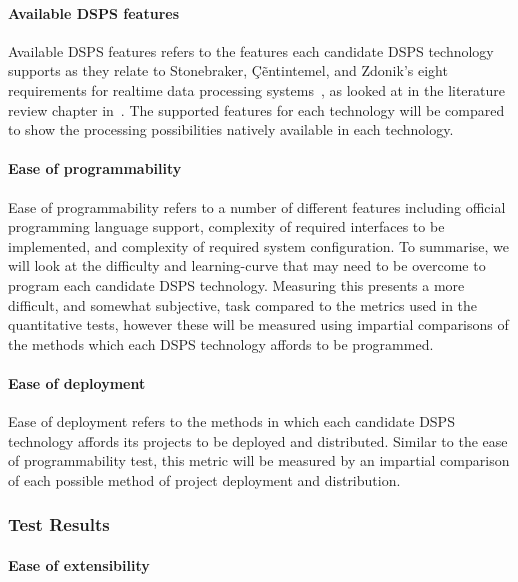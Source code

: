 \paragraph{Available DSPS features}

Available DSPS features refers to the features each candidate DSPS technology supports as they relate to Stonebraker,
\c{C}\~entintemel, and Zdonik's eight requirements for realtime data processing systems~\cite{stonebraker_8_2005}, as looked at
in the literature review chapter in~. The supported features for each technology will be compared to show the
processing possibilities natively available in each technology.

\paragraph{Ease of programmability}

Ease of programmability refers to a number of different features including official programming language support, complexity
of required interfaces to be implemented, and complexity of required system configuration. To summarise, we will look at
the difficulty and learning-curve that may need to be overcome to program each candidate DSPS technology. Measuring this
presents a more difficult, and somewhat subjective, task compared to the metrics used in the quantitative tests, however
these will be measured using impartial comparisons of the methods which each DSPS technology affords to be programmed.

\paragraph{Ease of deployment}

Ease of deployment refers to the methods in which each candidate DSPS technology affords its projects to be deployed and distributed.
Similar to the ease of programmability test, this metric will be measured by an impartial comparison of each possible
method of project deployment and distribution.



\subsubsection{Test Results} %
\label{ssub:qual_test_results}

\paragraph{Ease of extensibility}


